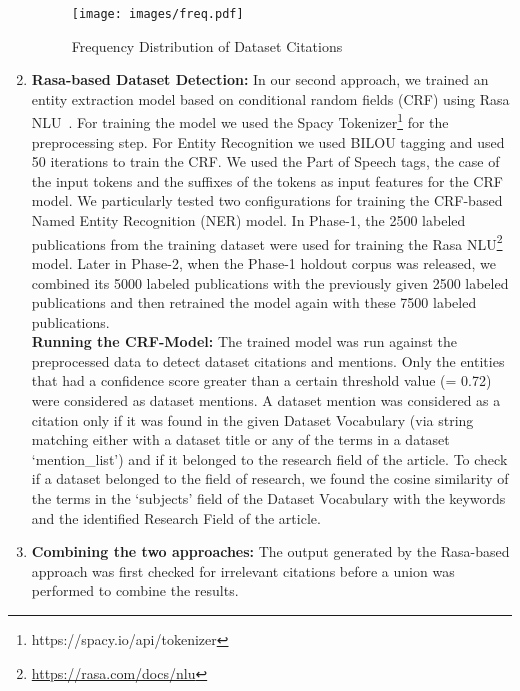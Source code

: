 \documentclass[runningheads]{llncs}
\begin{document}
\begin{enumerate}
		\begin{figure}[!htb]
			\centering
			\texttt{[image: images/freq.pdf]}
			\caption{Frequency Distribution of Dataset Citations}
			\label{fig:graph}
		\end{figure}
		
		\item \textbf{Rasa-based Dataset Detection:}
		In our second approach, we trained an entity extraction model based on conditional random fields (CRF) using Rasa NLU~\cite{DBLP:journals/corr/abs-1712-05181}. For training the model we used the Spacy Tokenizer\footnote{https://spacy.io/api/tokenizer} for the preprocessing step. For Entity Recognition we used BILOU tagging and used 50 iterations to train the CRF. We used the Part of Speech tags, the case of the input tokens and the suffixes of the tokens as input features for the CRF model. 
		We particularly tested two configurations for training the CRF-based Named Entity Recognition (NER) model. In Phase-1, the 2500 labeled publications from the training dataset were used for training the Rasa NLU\footnote{\url{https://rasa.com/docs/nlu}} model. Later in Phase-2, when the Phase-1 holdout corpus was released, we combined its 5000 labeled publications with the previously given 2500 labeled publications and then retrained the model again with these 7500 labeled publications. %
		\\
		\textbf{Running the CRF-Model:} The trained model was run against the preprocessed data to detect dataset citations and mentions. Only the entities that had a confidence score greater than a certain threshold value (= 0.72) were considered as dataset mentions. A dataset mention was considered as a citation only if it was found in the given Dataset Vocabulary (via string matching either with a dataset title or any of the terms in a dataset `mention\_list') and if it belonged to the research field of the article. %
		To check if a dataset belonged to the field of research, we found the cosine similarity of the terms in the ‘subjects’ field of the Dataset Vocabulary with the keywords and the identified Research Field of the article. 
		\smallskip
		\item \textbf{Combining the two approaches:}
		The output generated by the Rasa-based approach was first checked for irrelevant citations before a union was performed to combine the results. 

\end{enumerate}
\end{document}
